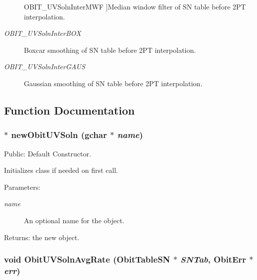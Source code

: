 \begin{Desc}
\begin{description}
{OBIT\_\-UVSoln\-Inter\-MWF\label{ObitUVSoln_8h_a35a14}
}]Median window filter of SN table before 2PT interpolation. \item[{\em 
OBIT\_\-UVSoln\-Inter\-BOX\label{ObitUVSoln_8h_a35a15}
}]Boxcar smoothing of SN table before 2PT interpolation. \item[{\em 
OBIT\_\-UVSoln\-Inter\-GAUS\label{ObitUVSoln_8h_a35a16}
}]Gaussian smoothing of SN table before 2PT interpolation. \end{description}
\end{Desc}



\subsection{Function Documentation}
\subsubsection{$\ast$ new\-Obit\-UVSoln (gchar $\ast$ {\em name})}\label{ObitUVSoln_8h_a18}


Public: Default Constructor. 

Initializes class if needed on first call. \begin{Desc}
\item[Parameters:]
\begin{description}
\item[{\em name}]An optional name for the object. \end{description}
\end{Desc}
\begin{Desc}
\item[Returns:]the new object. \end{Desc}
\subsubsection{\setlength{\rightskip}{0pt plus 5cm}void Obit\-UVSoln\-Avg\-Rate ({\bf Obit\-Table\-SN} $\ast$ {\em SNTab}, {\bf Obit\-Err} $\ast$ {\em err})}\label{ObitUVSoln_8h_a27}


